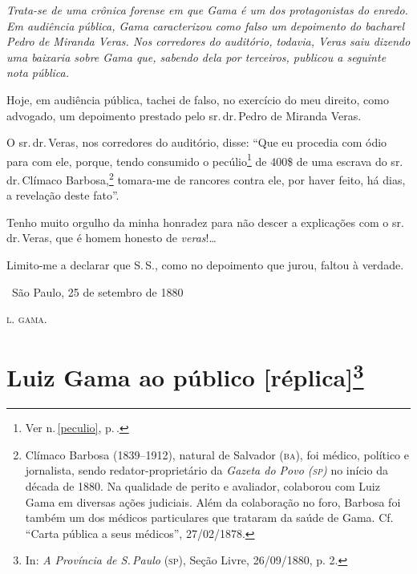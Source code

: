 
\begin{resumo}
\emph{Trata-se de uma crônica forense em que Gama é um dos protagonistas
do enredo. Em audiência pública, Gama caracterizou como falso um
depoimento do bacharel Pedro de Miranda Veras. Nos corredores do
auditório, todavia, Veras saiu dizendo uma baixaria sobre Gama que,
sabendo dela por terceiros, publicou a seguinte nota pública. }
\end{resumo}

Hoje, em audiência pública, tachei de falso, no exercício do meu
direito, como advogado, um depoimento prestado pelo sr.\,dr.\,Pedro de
Miranda Veras.

O sr.\,dr.\,Veras, nos corredores do auditório, disse: ``Que eu procedia
com ódio para com ele, porque, tendo consumido o pecúlio\footnote{
  Ver n.\,\ref{peculio}, p.\,\pageref{peculio}.} de 400\$ de uma escrava do sr.\,dr.\,Clímaco Barbosa,\footnote{Clímaco Barbosa (1839--1912), natural de \label{climaco}
  Salvador (\textsc{ba}), foi médico, político e jornalista, sendo
  redator-proprietário da \emph{Gazeta do Povo (\textsc{sp})} no início da década
  de 1880. Na qualidade de perito e avaliador, colaborou com Luiz Gama
  em diversas ações judiciais. Além da colaboração no foro, Barbosa foi
  também um dos médicos particulares que trataram da saúde de Gama. Cf.
  ``Carta pública a seus médicos'', 27/02/1878.}
tomara-me de rancores
contra ele, por haver feito, há dias, a revelação deste fato''.

Tenho muito orgulho da minha honradez para não descer a explicações com
o sr.\,dr.\,Veras, que é homem honesto de \emph{veras}!\ldots{}

Limito-me a declarar que S.\,S., como no depoimento que jurou, faltou à
verdade.\medskip

\hfill\ São Paulo, 25 de setembro de 1880

\hfill\textsc{l. gama.}

\section{Luiz Gama ao público {[}réplica{]}\protect\footnote{\MakeUppercase{I}n:
  \emph{\MakeUppercase{A P}rovíncia de \MakeUppercase{S.\,P}aulo} (\textsc{sp}), \MakeUppercase{S}eção \MakeUppercase{L}ivre, 26/09/1880, p. 2.}}

